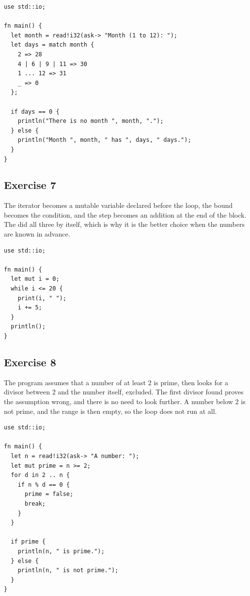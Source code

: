 \begin{lstlisting}[style=coloredverbatim, caption=Solution for exercise 6]
use std::io;

fn main() {
  let month = read!i32(ask-> "Month (1 to 12): ");
  let days = match month {
    2 => 28
    4 | 6 | 9 | 11 => 30
    1 ... 12 => 31
    _ => 0
  };

  if days == 0 {
    println("There is no month ", month, ".");
  } else {
    println("Month ", month, " has ", days, " days.");
  }
}
\end{lstlisting}

\subsection*{Exercise 7}

The iterator becomes a mutable variable declared before the loop, the bound
becomes the condition, and the step becomes an addition at the end of the block.
The  did all three by itself, which is why it is the better choice
when the numbers are known in advance.

\begin{lstlisting}[style=coloredverbatim, caption=Solution for exercise 7]
use std::io;

fn main() {
  let mut i = 0;
  while i <= 20 {
    print(i, " ");
    i += 5;
  }
  println();
}
\end{lstlisting}

\subsection*{Exercise 8}

The program assumes that a number of at least 2 is prime, then looks for a
divisor between 2 and the number itself, excluded. The first divisor found proves the assumption
wrong, and there is no need to look further. A number below 2 is not prime, and
the range  is then empty, so the loop does not run at all.

\begin{lstlisting}[style=coloredverbatim, caption=Solution for exercise 8]
use std::io;

fn main() {
  let n = read!i32(ask-> "A number: ");
  let mut prime = n >= 2;
  for d in 2 .. n {
    if n % d == 0 {
      prime = false;
      break;
    }
  }

  if prime {
    println(n, " is prime.");
  } else {
    println(n, " is not prime.");
  }
}
\end{lstlisting}

